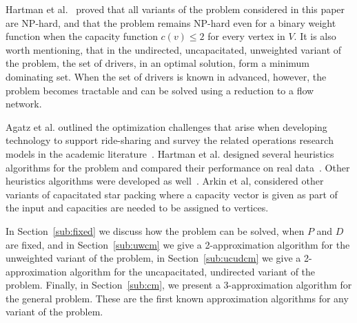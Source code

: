 Hartman et al.~\cite{hartman2013optimal} proved that all variants of the
\emph{\CARPOOL{}} problem considered in this paper are NP-hard,
and that the problem remains NP-hard even for a binary weight function when
the capacity function $c(v) \leq 2$ for every vertex in $V$.
It is also worth mentioning, that in the undirected, uncapacitated, unweighted
variant of the problem, the set of drivers, in an optimal solution,
form a minimum dominating set.
When the set of drivers is known in advanced, however, the problem becomes
tractable and can be solved using a reduction to a flow network.

Agatz et al. outlined the optimization challenges that arise 
when developing technology to support ride-sharing and survey the
related operations research models in the academic literature~\cite{agatz2012optimization}.  
Hartman et al. designed several heuristics algorithms for the 
\CARPOOL{} problem and compared 
their performance on real data~\cite{hartman2014theory}.
Other heuristics algorithms were developed as well~\cite{knapen2014exploiting}.
Arkin et al, considered other variants of capacitated star packing where
a capacity vector is given as part of the input and 
capacities are needed to be assigned to vertices.  


In Section~\ref{sub:fixed} we discuss how the problem can be solved,
when $P$ and $D$ are fixed,
and in Section~\ref{sub:uwcm} we give a 2-approximation algorithm for the
unweighted variant of the problem,
in Section~\ref{sub:ucudcm} we give a 2-approximation algorithm
for the uncapacitated, undirected variant of the problem. 
Finally, in Section~\ref{sub:cm}, we present a 3-approximation
algorithm for the general problem. 
These are the first known approximation algorithms for any variant of the problem.
